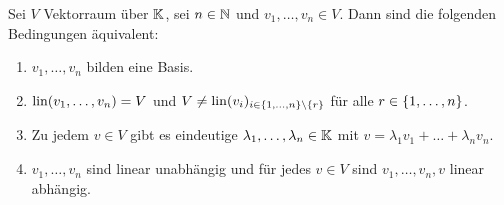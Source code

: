 \begin{thm}
	Sei $ V $ Vektorraum über $ \mathbb K $, sei $ n \in \mathbb N $ und $ v_1, \ldots, v_n \in V $. Dann sind die folgenden Bedingungen äquivalent:
	\begin{enumerate}[label=\normalfont(\roman*)]
		\item $ v_1, \ldots, v_n $ bilden eine Basis.
		\item $ \operatorname{lin}(v_1, \ldots, v_n) = V $ und $ V \neq \operatorname{lin}(v_i)_{i \in \{ 1, \ldots, n \} \setminus \{ r \}} $ für alle $ r \in \{ 1,\ldots,n \} $.
		\item Zu jedem $ v \in V $ gibt es eindeutige $ \lambda_1, \ldots, \lambda_n \in \mathbb K $ mit $ v = \lambda_1v_1 + \ldots + \lambda_nv_n $.
		\item $ v_1, \ldots, v_n $ sind linear unabhängig und für jedes $ v \in V $ sind $ v_1, \ldots, v_n, v $ linear abhängig.
	\end{enumerate}
\end{thm}
